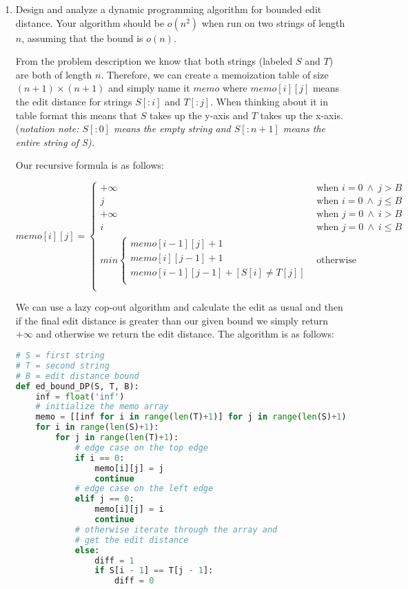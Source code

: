 \documentclass[11pt, letterpaper]{article}
\begin{document}
\begin{enumerate}
\item Design and analyze a dynamic programming algorithm for bounded edit distance. Your algorithm should be $o(n^2)$ when run on two strings of length $n$, assuming that the bound is $o(n)$.

\quad From the problem description we know that both strings (labeled $S$ and $T$) are both of length $n$. Therefore, we can create a memoization table of size $(n + 1) \times (n + 1)$ and simply name it $memo$ where $memo[i][j]$ means the edit distance for strings $S[:i]$ and $T[:j]$. When thinking about it in table format this means that $S$ takes up the y-axis and $T$ takes up the x-axis. (\textit{notation note: $S[:0]$ means the empty string and $S[:n+1]$ means the entire string of S).}

\begin{center}
Our recursive formula is as follows:
\end{center}

\[
memo[i][j] = 
\begin{cases}
+\infty & \text{when } i = 0\ \wedge\ j > B \\
j & \text{when } i = 0\ \wedge\ j \leq B \\
+\infty & \text{when } j = 0\ \wedge\ i > B \\
i & \text{when } j = 0\ \wedge\ i \leq B \\
min
\begin{cases}
memo[i - 1][j] + 1 \\
memo[i][j - 1] + 1 \\
memo[i - 1][j - 1] + [S[i] \neq T[j]] \\
\end{cases}
& \text{otherwise } \\
\end{cases}
\]

\quad We can use a lazy cop-out algorithm and calculate the edit as usual and then if the final edit distance is greater than our given bound we simply return $+\infty$ and otherwise we return the edit distance. The algorithm is as follows:

\begin{lstlisting}[language=python]
# S = first string
# T = second string
# B = edit distance bound
def ed_bound_DP(S, T, B):
    inf = float('inf')
    # initialize the memo array
    memo = [[inf for i in range(len(T)+1)] for j in range(len(S)+1)]
    for i in range(len(S)+1):
        for j in range(len(T)+1):
            # edge case on the top edge
            if i == 0:
                memo[i][j] = j
                continue
            # edge case on the left edge
            elif j == 0:
                memo[i][j] = i
                continue
            # otherwise iterate through the array and 
            # get the edit distance
            else:    
                diff = 1
                if S[i - 1] == T[j - 1]:
                    diff = 0


\end{lstlisting}
\end{enumerate}
\end{document}
